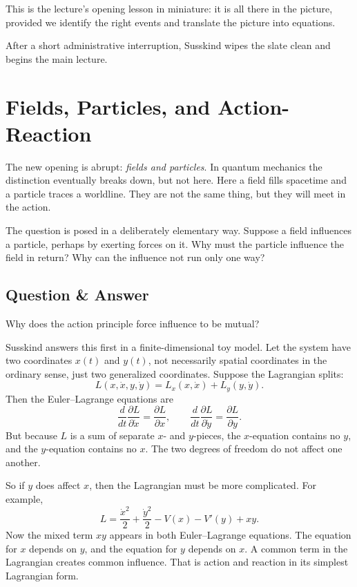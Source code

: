 This is the lecture's opening lesson in miniature: it is all there in the picture, provided we identify the right events and translate the picture into equations.

After a short administrative interruption, Susskind wipes the slate clean and begins the main lecture.

\section{Fields, Particles, and Action-Reaction}

The new opening is abrupt: \emph{fields and particles}. In quantum mechanics the distinction eventually breaks down, but not here. Here a field fills spacetime and a particle traces a worldline. They are not the same thing, but they will meet in the action.

The question is posed in a deliberately elementary way. Suppose a field influences a particle, perhaps by exerting forces on it. Why must the particle influence the field in return? Why can the influence not run only one way?

\subsection{Question \& Answer}

Why does the action principle force influence to be mutual?

Susskind answers this first in a finite-dimensional toy model. Let the system have two coordinates \(x(t)\) and \(y(t)\), not necessarily spatial coordinates in the ordinary sense, just two generalized coordinates. Suppose the Lagrangian splits:
\begin{equation}
L(x,\dot x,y,\dot y)=L_x(x,\dot x)+L_y(y,\dot y).
\end{equation}
Then the Euler--Lagrange equations are
\begin{equation}
\frac{d}{dt}\frac{\partial L}{\partial \dot x}=\frac{\partial L}{\partial x},
\qquad
\frac{d}{dt}\frac{\partial L}{\partial \dot y}=\frac{\partial L}{\partial y}.
\end{equation}
But because \(L\) is a sum of separate \(x\)- and \(y\)-pieces, the \(x\)-equation contains no \(y\), and the \(y\)-equation contains no \(x\). The two degrees of freedom do not affect one another.

So if \(y\) does affect \(x\), then the Lagrangian must be more complicated. For example,
\begin{equation}
L=\frac{\dot x^2}{2}+\frac{\dot y^2}{2}-V(x)-V'(y)+xy.
\end{equation}
Now the mixed term \(xy\) appears in both Euler--Lagrange equations. The equation for \(x\) depends on \(y\), and the equation for \(y\) depends on \(x\). A common term in the Lagrangian creates common influence. That is action and reaction in its simplest Lagrangian form.

